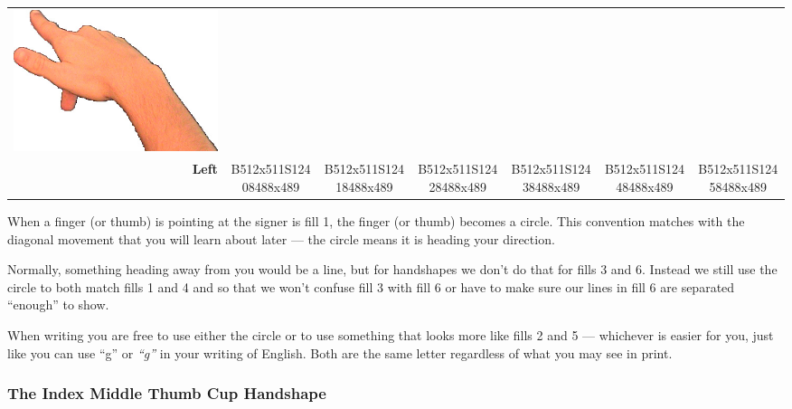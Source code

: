 \documentclass{article}
\begin{document}
\begin{center}
\begin{tabular}{r*{6}{c}}
\includegraphics[scale=0.1]{images/03-04-6.jpg}\\
\textbf{Left}&
B512x511S12408488x489&
B512x511S12418488x489&
B512x511S12428488x489&
B512x511S12438488x489&
B512x511S12448488x489&
B512x511S12458488x489\\
\end{tabular}
\end{center}

When a finger (or thumb) is pointing at the signer is fill 1, the finger (or thumb) becomes a circle.
This convention matches with the diagonal movement that you will learn about later --- the circle means it is heading your direction.

Normally, something heading away from you would be a line, but for handshapes we don't do that for fills 3 and 6.
Instead we still use the circle to both match fills 1 and 4 and so that we won't confuse fill 3 with fill 6 or have to make sure our lines in fill 6 are separated ``enough'' to show.

When writing you are free to use either the circle or to use something that looks more like fills 2 and 5 --- whichever is easier for you, just like you can use ``g'' or {\em ``g''} in your writing of English.
Both are the same letter regardless of what you may see in print.

\subsubsection{The Index Middle Thumb Cup Handshape}
\end{document}
